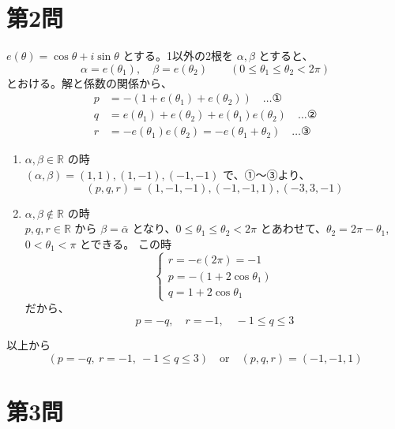 \documentclass[../main.tex]{subfiles}
\begin{document}
\newpage

\section*{第2問}

\noindent
[\textbf{解}] $e(\theta) = \cos\theta + i\sin\theta$ とする。1以外の2根を $\alpha, \beta$ とすると、
\[
  \alpha = e(\theta_1), \quad \beta = e(\theta_2) \qquad (0 \le \theta_1 \le \theta_2 < 2\pi)
\]
とおける。解と係数の関係から、
\begin{align*}
  p &= -(1 + e(\theta_1) + e(\theta_2)) \quad \dots \text{①} \\
  q &= e(\theta_1) + e(\theta_2) + e(\theta_1)e(\theta_2) \quad \dots \text{②} \\
  r &= -e(\theta_1)e(\theta_2) = -e(\theta_1 + \theta_2) \quad \dots \text{③}
\end{align*}

\begin{enumerate}
  \item[$1^\circ$] $\alpha, \beta \in \mathbb{R}$ の時\\
    $(\alpha, \beta) = (1, 1), (1, -1), (-1, -1)$ で、①〜③より、
    \[
      (p, q, r) = (1, -1, -1), (-1, -1, 1), (-3, 3, -1)
    \]

  \item[$2^\circ$] $\alpha, \beta \notin \mathbb{R}$ の時\\
    $p, q, r \in \mathbb{R}$ から $\beta = \bar{\alpha}$ となり、$0 \le \theta_1 \le \theta_2 < 2\pi$ とあわせて、$\theta_2 = 2\pi - \theta_1$, $0 < \theta_1 < \pi$ とできる。
    この時
    \[
      \begin{cases}
        r = -e(2\pi) = -1 \\
        p = -(1 + 2\cos\theta_1) \\
        q = 1 + 2\cos\theta_1
      \end{cases}
    \]
    だから、
    \[
      p = -q, \quad r = -1, \quad -1 \le q \le 3
    \]
\end{enumerate}
以上から
\[
  (p = -q, \ r = -1, \ -1 \le q \le 3) \quad \text{or} \quad (p, q, r) = (-1, -1, 1)
\]

\newpage

\section*{第3問}
\end{document}
